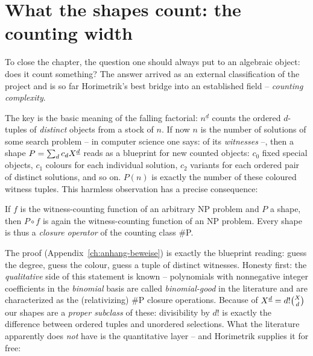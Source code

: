 \section{What the shapes count: the counting width}
\label{sec:zaehlbreite}

To close the chapter, the question one should always put to an
algebraic object: does it count something? The answer arrived as
an external classification of the project and is so far
Horimetrik's best bridge into an established field --
\emph{counting complexity}.

The key is the basic meaning of the falling factorial:
$n^{\underline d}$ counts the ordered $d$-tuples of
\emph{distinct} objects from a stock of $n$. If now $n$ is the
number of solutions of some search problem -- in computer science
one says: of its \emph{witnesses} --, then a shape
$P=\sum_d c_dX^{\underline{d}}$ reads as a blueprint for new counted objects:
$c_0$ fixed special objects, $c_1$ colours for each individual
solution, $c_2$ variants for each ordered pair of distinct
solutions, and so on. $P(n)$ is exactly the number of these
coloured witness tuples. This harmless observation has a precise
consequence:

\begin{satz}
If $f$ is the witness-counting function of an arbitrary NP
problem and $P$ a shape, then $P\circ f$ is again the
witness-counting function of an NP problem. Every shape is thus a
\emph{closure operator} of the counting class \#P.
\end{satz}

The proof (Appendix~\ref{ch:anhang-beweise}) is exactly the
blueprint reading: guess the degree, guess the colour, guess a
tuple of distinct witnesses. Honesty first: the \emph{qualitative}
side of this statement is known -- polynomials with nonnegative
integer coefficients in the \emph{binomial} basis are called
\emph{binomial-good} in the literature and are characterized as
the (relativizing) \#P closure operations. Because of
$X^{\underline{d}}=d!\binom Xd$ our shapes are a \emph{proper subclass} of
these: divisibility by $d!$ is exactly the difference between
ordered tuples and unordered selections. What the literature
apparently does \emph{not} have is the quantitative layer -- and
Horimetrik supplies it for free:

